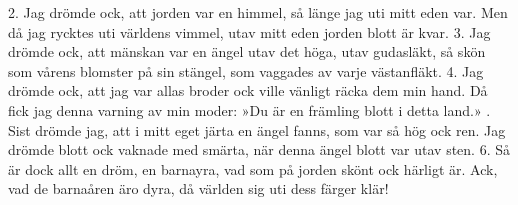 \begin{multicols}{2}
2.  Jag drömde ock, att jorden var en himmel,
    så länge jag uti mitt eden var.
    Men då jag rycktes uti världens vimmel,
    utav mitt eden jorden blott är kvar.
3.  Jag drömde ock, att mänskan var en ängel
    utav det höga, utav gudasläkt,
    så skön som vårens blomster på sin stängel,
    som vaggades av varje västanfläkt.
4.  Jag drömde ock, att jag var allas broder
    ock ville vänligt räcka dem min hand.
    Då fick jag denna varning av min moder:
    »Du är en främling blott i detta land.»
\vfill{}.  Sist drömde jag, att i mitt eget järta
    en ängel fanns, som var så hög ock ren.
    Jag drömde blott ock vaknade med smärta,
    när denna ängel blott var utav sten.
6.  Så är dock allt en dröm, en barnayra,
    vad som på jorden skönt ock härligt är.
    Ack, vad de barnaåren äro dyra,
    då världen sig uti dess färger klär!
\end{multicols}
